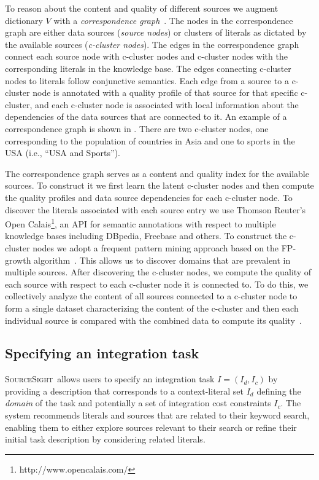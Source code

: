 \documentclass{vldb}
\newcommand\system{\textsc{SourceSight}}
\begin{document}
To reason about the content and quality of different sources we augment dictionary $V$ with a {\em correspondence graph}~\cite{rekatsinas:2015}. The nodes in the correspondence graph are either data sources ({\em source nodes}) or clusters of literals as dictated by the available sources ({\em c-cluster nodes}). The edges in the correspondence graph connect each source node with c-cluster nodes and c-cluster nodes with the corresponding literals in the knowledge base.  The edges connecting c-cluster nodes to literals follow conjunctive semantics. Each edge from a source to a c-cluster node is annotated with a quality profile of that source for that specific c-cluster, and each c-cluster node is associated with local information about the dependencies of the data sources that are connected to it. An example of a correspondence graph is shown in . There are two c-cluster nodes, one corresponding to the population of countries in Asia and one to sports in the USA (i.e., ``USA and Sports''). 

The correspondence graph serves as a content and quality index for the available sources. To construct it we first learn the latent c-cluster nodes and then compute the quality profiles and data source dependencies for each c-cluster node. To discover the literals associated with each source entry we use Thomson Reuter's Open Calais\footnote{http://www.opencalais.com/}, an API for semantic annotations with respect to multiple knowledge bases including DBpedia, Freebase and others. To construct the c-cluster nodes we adopt a frequent pattern mining approach based on the FP-growth algorithm~\cite{Han:2000}. This allows us to discover domains that are prevalent in multiple sources. After discovering the c-cluster nodes, we compute the quality of each source with respect to each c-cluster node it is connected to. To do this, we collectively analyze the content of all sources connected to a c-cluster node to form a single dataset characterizing the content of the c-cluster and then each individual source is compared with the combined data to compute its quality~\cite{rekatsinas:2015}. 

\subsection{Specifying an integration task}
\label{sec:integtask}
\system~allows users to specify an integration task $I = (I_d, I_c)$ by providing a description that corresponds to a context-literal set $I_d$ defining the {\em domain} of the task and potentially a set of integration cost constraints $I_c$. The system recommends literals and sources that are related to their keyword search, enabling them to either explore sources relevant to their search or refine their initial task description by considering related literals.
\end{document}
